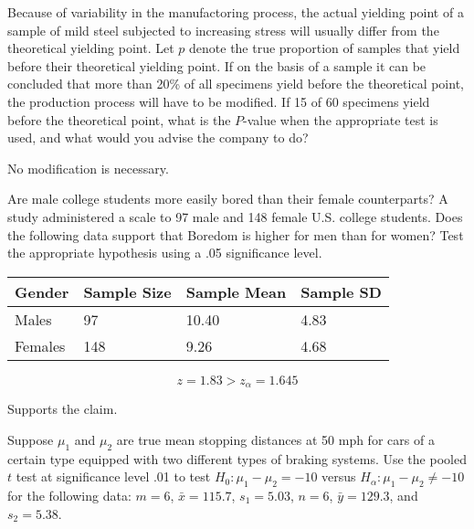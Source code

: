 \begin{questions}
\begin{solution}
    \end{solution}


    \question[3] Because of variability in the manufactoring process,
    the actual yielding point of a sample of mild steel subjected to
    increasing stress will usually differ from the theoretical
    yielding point. Let $p$ denote the true proportion of samples that
    yield before their theoretical yielding point. If on the basis of
    a sample it can be concluded that more than 20\% of all specimens
    yield before the theoretical point, the production process will
    have to be modified. If 15 of 60 specimens yield before the
    theoretical point, what is the $P$-value when the appropriate test
    is used, and what would you advise the company to do?

    \begin{solution}

        No modification is necessary.

    \end{solution}


    \question[2] Are male college students more easily bored than
    their female counterparts? A study administered a scale to 97 male
    and 148 female U.S. college students. Does the following data
    support that Boredom is higher for men than for women? Test the
    appropriate hypothesis using a .05 significance level.

    \begin{center}
        \begin{tabular}{llll}
        Gender & Sample Size & Sample Mean & Sample SD \\
        \hline
        Males & 97 & 10.40 & 4.83 \\
        Females & 148 & 9.26 & 4.68 
        \end{tabular}
    \end{center}

    \begin{solution}

        $$z = 1.83 > z_\alpha = 1.645$$
        
        Supports the claim.
      
    \end{solution}


    \question[2] Suppose $\mu_1$ and $\mu_2$ are true mean stopping
    distances at 50 mph for cars of a certain type equipped with two
    different types of braking systems. Use the pooled $t$ test at
    significance level .01 to test $H_0 : \mu_1 - \mu_2 = -10$ versus
    $H_\alpha : \mu_1 - \mu_2 \ne -10$ for the following data: $m =
    6$, $\bar{x} = 115.7$, $s_1 = 5.03$, $n = 6$, $\bar{y} = 129.3$,
    and $s_2 = 5.38$.


\end{questions}

